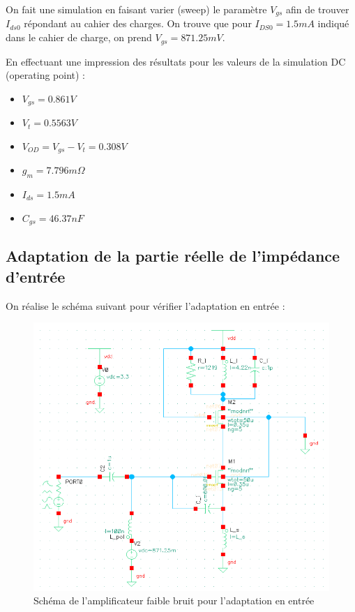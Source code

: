 \documentclass[a4paper]{article}
\begin{document}
On fait une simulation en faisant varier (sweep) le param\`etre $V_{gs}$ afin de trouver $I_{ds0}$ r\'epondant au cahier des charges.
On trouve que pour $I_{DS0} = 1.5 mA$ indiqu\'e dans le cahier de charge, on prend
$V_{gs} = 871.25 mV$.

En effectuant une impression des r\'esultats pour les valeurs de la simulation DC (operating point) :
\begin{itemize} \itemsep -3pt
  \item $V_{gs} = 0.861 V$
  \item $V_t = 0.5563 V$
  \item $V_{OD} = V_{gs} - V_{t} = 0.308V$
  \item $g_m = 7.796 m\Omega$
  \item $I_{ds} = 1.5 mA$
  \item $C_{gs} = 46.37 nF$
\end{itemize}

\clearpage

\subsection{Adaptation de la partie r\'eelle de l'imp\'edance d'entr\'ee}

On r\'ealise le sch\'ema suivant pour v\'erifier l'adaptation en entr\'ee :

\begin{figure}[!htb]
\begin{center}
  \includegraphics[scale=0.35]{Q2-schematic-adaptation.png}
  \caption{Sch\'ema de l'amplificateur faible bruit pour l'adaptation en entr\'ee}
  \label{lna-adaptation}
\end{center}
\end{figure}
\end{document}
